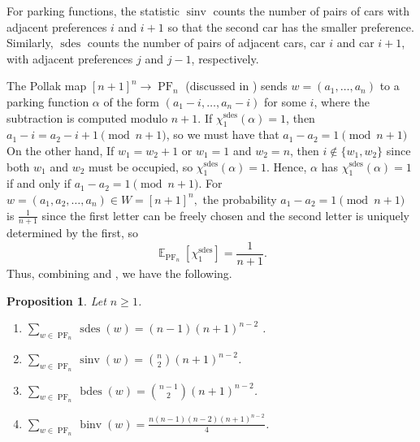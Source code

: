 \documentclass{amsart}
\DeclareMathOperator{\sinv}{sinv}
\DeclareMathOperator{\sdes}{sdes}
\DeclareMathOperator{\bdes}{bdes}
\DeclareMathOperator{\binv}{binv}
\DeclareMathOperator{\PF}{PF}
\DeclareMathOperator{\E}{\mathbb{E}}
\newtheorem{proposition}[theorem]{Proposition}
\theoremstyle{definition}
\begin{document}
For parking functions, the statistic $\sinv$ counts the number of pairs of cars with adjacent preferences $i$ and $i+1$ so that the second car has the smaller preference. Similarly, $\sdes$ counts the number of pairs of adjacent cars, car $i$ and car $i+1$, with adjacent preferences $j$ and $j-1$, respectively. 

The Pollak map $[n+1]^n\to \PF_n$ (discussed in ) sends $w=(a_1,\dots, a_n)$ to a parking function $\alpha$ of the form $(a_1-i,\dots, a_n-i)$ for some $i$, where the subtraction is computed modulo $n+1$.  If $\chi_1^{\sdes}(\alpha)=1$, then $a_1-i=a_2-i+1\pmod{n+1}$, so we must have that $a_1-a_2=1 \pmod{n+1}$  On the other hand, If $w_1=w_{2}+1$ or $w_1=1$ and $w_2=n$, then $i\not\in \{w_1,w_2\}$ since both $w_1$ and $w_2$ must be occupied, so $\chi_1^{\sdes}(\alpha)=1$. Hence, $\alpha$ has $\chi_1^{\sdes}(\alpha)=1$ if and only if $a_1-a_2=1 \pmod{n+1}$. For $w=(a_1,a_2,\dots,a_n)\in W=[n+1]^n,$  the probability $a_1-a_2=1\pmod{n+1}$ is $\frac{1}{n+1}$ since the first letter can be freely chosen and the second letter is uniquely determined by the first, so
\begin{equation}\label{eq:exp-of-1-sdes-pf}\E_{\PF_n}[\chi_1^{\sdes}]=\frac{1}{n+1}.\end{equation} 
  Thus, combining  and , we have the following.
\begin{proposition}\label{prop:sdes_sinv_bdes_binvPF}
    Let $n\geq 1$.
\begin{enumerate}
    \item $\sum_{w\in \PF_n} \sdes(w) = (n-1)(n+1)^{n-2}$ .
    \item $\sum_{w\in \PF_n} \sinv(w) = \binom{n}{2}(n+1)^{n-2}$.
    \item $\sum_{w\in \PF_n}\bdes(w)=\binom{n-1}{2}(n+1)^{n-2}$.
    \item $\sum_{w\in \PF_n}\binv(w) = \frac{n(n-1)(n-2)(n+1)^{n-2}}{4}$.
\end{enumerate}
\end{proposition}
\end{document}
